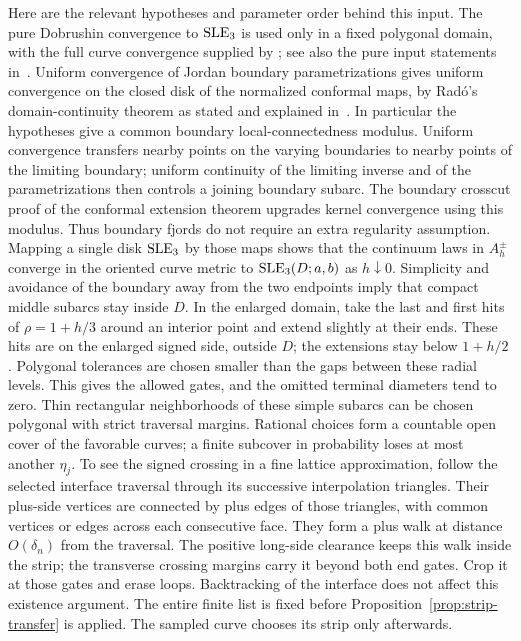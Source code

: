 Here are the relevant hypotheses and parameter order behind this
input.  The pure Dobrushin convergence to $\operatorname{SLE}_3$ is used only in a
fixed polygonal domain, with the full curve convergence supplied by
\cite{CDHKS,KS}; see also the pure input statements in~\cite{R,S}.
Uniform convergence of Jordan boundary parametrizations gives
uniform convergence on the closed disk of the normalized conformal
maps, by Rad\'o's domain-continuity theorem as stated and explained
in~\cite[Section~7, beginning of ``From fixed strip tests to limiting
barriers'']{S}.  In particular the hypotheses give a common boundary
local-connectedness modulus.  Uniform convergence transfers nearby
points on the varying boundaries to nearby points of the limiting
boundary; uniform continuity of the limiting inverse and of the
parametrizations then controls a joining boundary subarc.  The boundary
crosscut proof of the conformal extension theorem upgrades kernel
convergence using this modulus.  Thus boundary fjords do not require
an extra regularity assumption.  Mapping a single disk
$\operatorname{SLE}_3$ by those maps shows that the continuum laws in $A_h^\pm$
converge in the oriented curve metric to $\operatorname{SLE}_3(D;a,b)$ as
$h\downarrow0$.  Simplicity and avoidance of the boundary away from
the two endpoints imply that compact middle subarcs stay inside $D$.
In the enlarged domain, take the last and first hits of
$\rho=1+h/3$ around an interior point and extend slightly at their
ends.  These hits are on the enlarged signed side, outside $D$;
the extensions stay below $1+h/2$.  Polygonal tolerances are chosen
smaller than the gaps between these radial levels.  This gives the allowed gates,
and the omitted terminal diameters tend to zero.  Thin rectangular
neighborhoods of these simple subarcs can be chosen polygonal with
strict traversal margins.  Rational choices form a countable open
cover of the favorable curves; a finite subcover in probability
loses at most another $\eta_j$.  To see the signed crossing in a fine
lattice approximation, follow the selected interface traversal through
its successive interpolation triangles.  Their plus-side vertices
are connected by plus edges of those triangles, with common vertices
or edges across each consecutive face.  They form a plus walk at
distance $O(\delta_n)$ from the traversal.  The positive long-side
clearance keeps this walk inside the strip; the transverse crossing
margins carry it beyond both end gates.  Crop it at those gates and
erase loops.  Backtracking of the interface does not affect this
existence argument.  The entire finite list is fixed
before Proposition~\ref{prop:strip-transfer} is applied.  The sampled
curve chooses its strip only afterwards.

